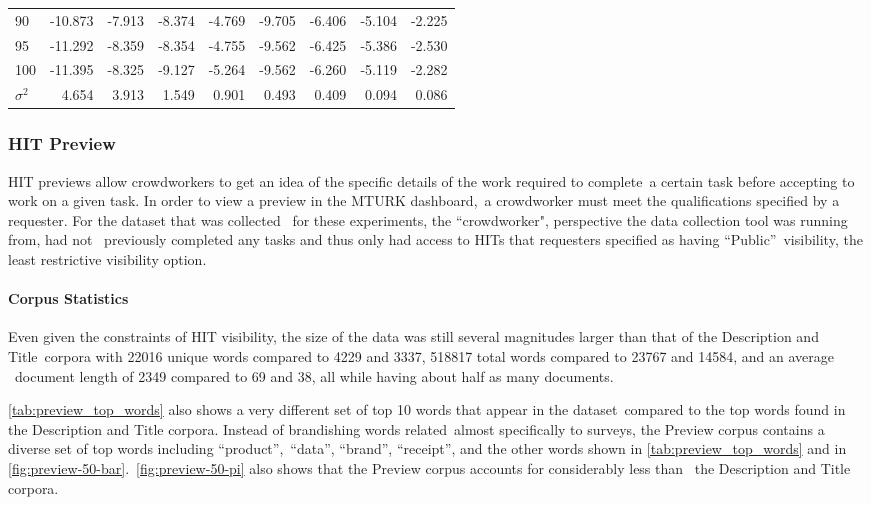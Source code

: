\documentclass[letterpaper,12pt]{article}
\begin{document}
\begin{table}
\begin{center}
\begin{tabular}{|l|rr|rr|rr|rr|}
			90  & -10.873 & -7.913 & -8.374 & -4.769 &  -9.705 & -6.406 & -5.104 & -2.225 \\
			95  & -11.292 & -8.359 & -8.354 & -4.755 &  -9.562 & -6.425 & -5.386 & -2.530 \\
			100 & -11.395 & -8.325 & -9.127 & -5.264 &  -9.562 & -6.260 & -5.119 & -2.282 \\
			\hline
			$\sigma^2$ & 4.654 & 3.913 & 1.549 & 0.901 & 0.493 & 0.409 & 0.094 & 0.086 \\ 
			\hline
			\end{tabular}
	\end{center}
\end{table}



\newpage
\subsubsection{HIT Preview}
HIT previews allow crowdworkers to get an idea of the specific details of the work required to complete\
a certain task before accepting to work on a given task. In order to view a preview in the MTURK dashboard,\
a crowdworker must meet the qualifications specified by a requester. For the dataset that was collected \
for these experiments, the ``crowdworker", perspective the data collection tool was running from, had not \
previously completed any tasks and thus only had access to HITs that requesters specified as having ``Public''\
visibility, the least restrictive visibility option.



\paragraph{Corpus Statistics}
Even given the constraints of HIT visibility, the size of the data was still several magnitudes larger than that of the Description and Title\
corpora with 22016 unique words compared to 4229 and 3337, 518817 total words compared to 23767 and 14584, and an average \
document length of 2349 compared to 69 and 38, all while having about half as many documents.

\ref{tab:preview_top_words} also shows a very different set of top 10 words that appear in the dataset\
compared to the top words found in the Description and Title corpora. Instead of brandishing words related\
almost specifically to surveys, the Preview corpus contains a diverse set of top words including ``product'',\
``data'', ``brand'', ``receipt'', and the other words shown in \ref{tab:preview_top_words} and in \ref{fig:preview-50-bar}.\
\ref{fig:preview-50-pi} also shows that the Preview corpus accounts for considerably less than \
the Description and Title corpora.
\end{document}
